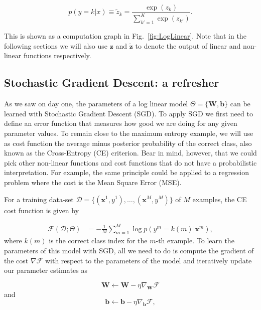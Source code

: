\begin{equation}
p(y=k|{x}) \equiv \tilde{z}_k = \frac{\exp(z_k)}{\sum_{k'=1}^{K} \exp(z_{k'})}.
\label{eq:softmax}
\end{equation}

This is shown as a computation graph in Fig.~\ref{fig:LogLinear}. Note that in
the following sections we will also use $\mathbf{z}$ and $\tilde{\mathbf{z}}$
to denote the output of linear and non-linear functions respectively.

\subsection{Stochastic Gradient Descent: a refresher}

As we saw on day one, the parameters of a log linear model
$\Theta=\{\mathbf{W}, \mathbf{b}\}$ can be learned with Stochastic Gradient Descent (SGD). To apply SGD we first need to define an error function that measures how
good we are doing for any given parameter values. %
 To remain close to the maximum
entropy example, we will use as cost function the average minus posterior probability of
the correct class, also known as the Cross-Entropy (CE) criterion. Bear in
mind, however, that we could pick other non-linear functions and cost functions
that do not have
a probabilistic interpretation. For example, the same principle could be applied to
a regression problem where the cost is the Mean Square Error (MSE).

For a training data-set $\mathcal{D} = \{(\mathbf{x}^1,y^1), \ldots,
(\mathbf{x}^M,y^M)\}$ of $M$ examples, the CE cost function is given by

\begin{align}
\mathcal{F}(\mathcal{D};\Theta) 
& = -\frac{1}{M}\sum_{m=1}^{M} \log p(y^m=k(m) | \mathbf{x}^m),
\label{eq:CostLogPos}
\end{align}
%
where $k(m)$ is the correct class index for the $m$-th example.
To learn the parameters of this model with SGD, all we need to do is compute the gradient
of the cost $\nabla\mathcal{F}$ with respect to the parameters of the model and
iteratively update our  parameter estimates as 

\begin{equation}
\mathbf{W} \leftarrow \mathbf{W} - \eta \nabla_\mathbf{W}\mathcal{F}
\end{equation}
and
\begin{equation}
\mathbf{b} \leftarrow \mathbf{b} - \eta \nabla_\mathbf{b}\mathcal{F},
\end{equation}

